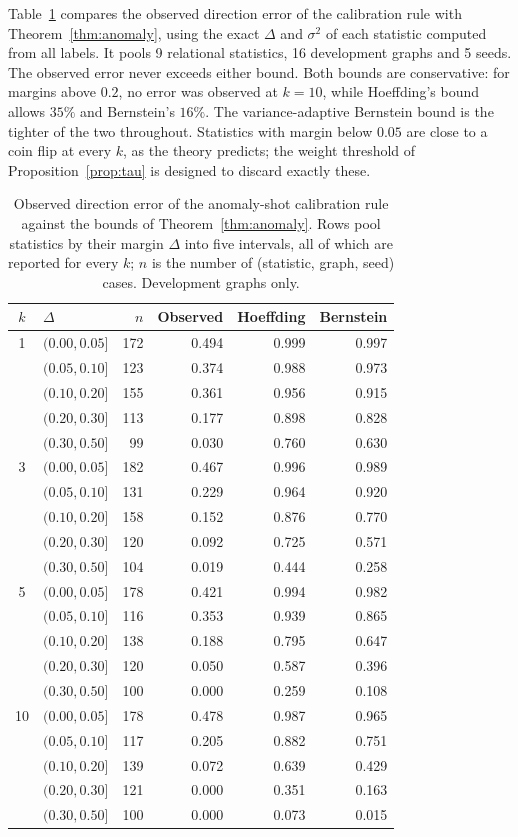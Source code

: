 Table~\ref{tab:bound} compares the observed direction error of the calibration rule with Theorem~\ref{thm:anomaly}, using the exact $\Delta$ and $\sigma^2$ of each statistic computed from all labels. It pools 9 relational statistics, 16 development graphs and 5 seeds. The observed error never exceeds either bound. Both bounds are conservative: for margins above $0.2$, no error was observed at $k = 10$, while Hoeffding's bound allows $35\%$ and Bernstein's $16\%$. The variance-adaptive Bernstein bound is the tighter of the two throughout. Statistics with margin below $0.05$ are close to a coin flip at every $k$, as the theory predicts; the weight threshold of Proposition~\ref{prop:tau} is designed to discard exactly these.

\begin{table}[t]
\caption{Observed direction error of the anomaly-shot calibration rule against the bounds of Theorem~\ref{thm:anomaly}. Rows pool statistics by their margin $\Delta$ into five intervals, all of which are reported for every $k$; $n$ is the number of (statistic, graph, seed) cases. Development graphs only.}\label{tab:bound}
\centering\small
\begin{tabular}{@{}cl rrrr@{}}
\toprule
$k$ & $\Delta$ & $n$ & Observed & Hoeffding & Bernstein \\
\midrule
1 & $(0.00, 0.05]$ & 172 & 0.494 & 0.999 & 0.997 \\
 & $(0.05, 0.10]$ & 123 & 0.374 & 0.988 & 0.973 \\
 & $(0.10, 0.20]$ & 155 & 0.361 & 0.956 & 0.915 \\
 & $(0.20, 0.30]$ & 113 & 0.177 & 0.898 & 0.828 \\
 & $(0.30, 0.50]$ & 99 & 0.030 & 0.760 & 0.630 \\
\midrule
3 & $(0.00, 0.05]$ & 182 & 0.467 & 0.996 & 0.989 \\
 & $(0.05, 0.10]$ & 131 & 0.229 & 0.964 & 0.920 \\
 & $(0.10, 0.20]$ & 158 & 0.152 & 0.876 & 0.770 \\
 & $(0.20, 0.30]$ & 120 & 0.092 & 0.725 & 0.571 \\
 & $(0.30, 0.50]$ & 104 & 0.019 & 0.444 & 0.258 \\
\midrule
5 & $(0.00, 0.05]$ & 178 & 0.421 & 0.994 & 0.982 \\
 & $(0.05, 0.10]$ & 116 & 0.353 & 0.939 & 0.865 \\
 & $(0.10, 0.20]$ & 138 & 0.188 & 0.795 & 0.647 \\
 & $(0.20, 0.30]$ & 120 & 0.050 & 0.587 & 0.396 \\
 & $(0.30, 0.50]$ & 100 & 0.000 & 0.259 & 0.108 \\
\midrule
10 & $(0.00, 0.05]$ & 178 & 0.478 & 0.987 & 0.965 \\
 & $(0.05, 0.10]$ & 117 & 0.205 & 0.882 & 0.751 \\
 & $(0.10, 0.20]$ & 139 & 0.072 & 0.639 & 0.429 \\
 & $(0.20, 0.30]$ & 121 & 0.000 & 0.351 & 0.163 \\
 & $(0.30, 0.50]$ & 100 & 0.000 & 0.073 & 0.015 \\
\bottomrule
\end{tabular}
\end{table}
